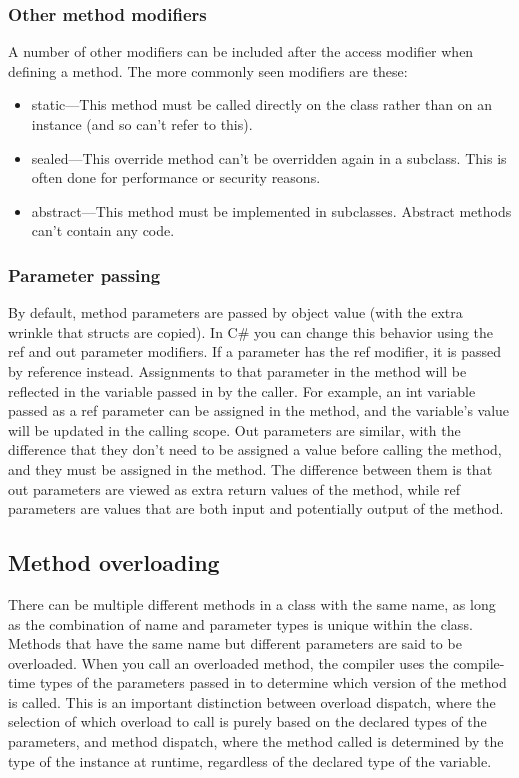 \documentclass[12pt,a4paper,final,twoside,onecolumn,titlepage]{book}
\begin{document}
\subsubsection{Other method modifiers}
A number of other modifiers can be included after the access modifier when defining a method. The more commonly seen modifiers are these:
\begin{itemize}
\item static—This method must be called directly on the class rather than on an instance (and so can’t refer to this).
\item sealed—This override method can’t be overridden again in a subclass. This is often done for performance or security reasons.
\item abstract—This method must be implemented in subclasses. Abstract methods can’t contain any code.
\end{itemize}
\subsubsection{Parameter passing}
By default, method parameters are passed by object value (with the extra wrinkle that structs are copied).
In C\# you can change this behavior using the ref and out parameter modifiers. If a parameter has the ref modifier, it is passed by reference instead. Assignments to that parameter in the method will be reflected in the variable passed in by the caller. For example, an int variable passed as a ref parameter can be assigned in the method, and the variable’s value will be updated in the calling scope. Out parameters are similar, with the difference that they don’t need to be assigned a value before calling the method, and they must be assigned in the method. The difference between them is that out parameters are viewed as extra return values of the method, while ref parameters are values that are both input and potentially output of the method.
\subsection{Method overloading}
There can be multiple different methods in a class with the same name, as long as the combination of name and parameter types is unique within the class. Methods that have the same name but different parameters are said to be overloaded. When you call an overloaded method, the compiler uses the compile-time types of the parameters passed in to determine which version of the method is called. This is an important distinction between overload dispatch, where the selection of which overload to call is purely based on the declared types of the parameters, and method dispatch, where the method called is determined by the type of the instance at runtime, regardless of the declared type of the variable.
\end{document}
